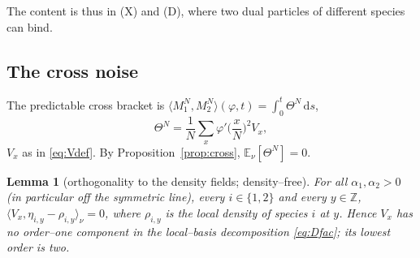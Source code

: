 \documentclass[11pt]{article}
\theoremstyle{plain}
\newtheorem{lemma}[theorem]{Lemma}
\theoremstyle{definition}
\theoremstyle{remark}
\newcommand{\Z}{\mathbb{Z}}\newcommand{\R}{\mathbb{R}}\newcommand{\N}{\mathbb{N}}
\newcommand{\E}{\mathbb{E}}\newcommand{\PP}{\mathbb{P}}\newcommand{\dd}{\,\mathrm{d}}
\newcommand{\ip}[2]{\langle #1,#2\rangle_\nu}\newcommand{\bone}{\mathbf 1}
\begin{document}
\noindent The content is thus in (X) and (D), where two dual particles of different
species can bind.

\subsection{The cross noise}
The predictable cross bracket is $\langle M_1^N,M_2^N\rangle(\varphi,t)=\int_0^t\Theta^N\dd s$,
\begin{equation}\label{eq:Theta}
  \Theta^N=\frac1N\sum_x\varphi'\Big(\frac xN\Big)^2 V_x,
\end{equation}
$V_x$ as in \eqref{eq:Vdef}. By Proposition~\ref{prop:cross}, $\E_\nu[\Theta^N]=0$.

\begin{lemma}[orthogonality to the density fields; density--free]\label{lem:orth}
For all $\alpha_1,\alpha_2>0$ (in particular off the symmetric line), every
$i\in\{1,2\}$ and every $y\in\Z$, $\ip{V_x}{\eta_{i,y}-\rho_{i,y}}=0$, where
$\rho_{i,y}$ is the local density of species $i$ at $y$. Hence $V_x$ has no order--one
component in the local--basis decomposition \eqref{eq:Dfac}; its lowest order is two.
\end{lemma}
\end{document}
